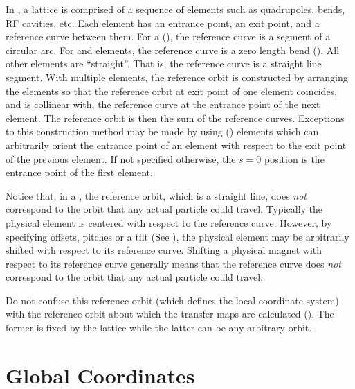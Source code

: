 In \bmad, a lattice is comprised of a sequence of elements such as
quadrupoles, bends, RF cavities, etc. Each element has an entrance
point, an exit point, and a reference curve between them. For a
 (), the reference curve is a segment of a
circular arc. For  and  elements, the reference
curve is a zero length bend (). All other
elements are ``straight''. That is, the reference curve is a straight
line segment. With multiple elements, the reference orbit is
constructed by arranging the elements so that the reference orbit at
exit point of one element coincides, and is collinear with, the
reference curve at the entrance point of the next element. The
reference orbit is then the sum of the reference curves. Exceptions to
this construction method may be made by using 
() elements which can arbitrarily orient the entrance
point of an element with respect to the exit point of the previous
element. If not specified otherwise, the $s = 0$ position is the
entrance point of the first element.

Notice that, in a , the reference orbit, which is a
straight line, does {\em not} correspond to the orbit that any actual
particle could travel. Typically the physical element is
centered with respect to the reference curve. However, by specifying offsets, 
pitches or a tilt (See ), the physical element may be
arbitrarily shifted with respect to its reference curve.  Shifting a
physical magnet with respect to its reference curve generally means
that the reference curve does {\em not} correspond to the orbit that
any actual particle could travel.

Do not confuse this reference orbit (which defines the local
coordinate system) with the reference orbit about which the transfer
maps are calculated (). The former is fixed by the
lattice while the latter can be any arbitrary orbit.

\section{Global Coordinates}
\label{s:global}

